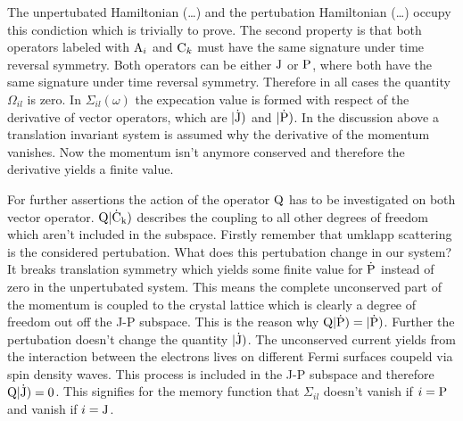The unpertubated Hamiltonian (\dots{}) and the pertubation Hamiltonian (\dots{}) occupy this condiction which is trivially to prove.
The second property is that both operators labeled with $\mathrm{A}_{i}$ and $\mathrm{C}_{k}$ must have the same signature under time reversal symmetry.
Both operators can be either $\mathrm{J}$ or $\mathrm{P}$, where both have the same signature under time reversal symmetry.
Therefore in all cases the quantity $\Omega_{il}$ is zero.
In $\Sigma_{il}(\omega)$ the expecation value is formed with respect of the derivative of vector operators, which are $|\mathrm{\dot{\mathrm{J}}})$ and $|\mathrm{\dot{\mathrm{P}}})$.
In the discussion above a translation invariant system is assumed why the derivative of the momentum vanishes.
Now the momentum isn't anymore conserved and therefore the derivative yields a finite value.

For further assertions the action of the operator $\mathrm{Q}$ has to be investigated on both vector operator.
$\mathrm{Q} |\mathrm{\dot{\mathrm{C}}_{k}})$ describes the coupling to all other degrees of freedom which aren't included in the subspace.
Firstly remember that umklapp scattering is the considered pertubation.
What does this pertubation change in our system?
It breaks translation symmetry which yields some finite value for $\dot{\mathrm{P}}$ instead of zero in the unpertubated system.
This means the complete unconserved part of the momentum is coupled to the crystal lattice which is clearly a degree of freedom out off the J-P subspace.
This is the reason why $\mathrm{Q} |\mathrm{\dot{\mathrm{P}}}) = |\mathrm{\dot{\mathrm{P}}})$.
Further the pertubation doesn't change the quantity $|\mathrm{\dot{\mathrm{J}}})$.
The unconserved current yields from the interaction between the electrons lives on different Fermi surfaces coupeld via spin density waves.
This process is included in the J-P subspace and therefore $\mathrm{Q} |\mathrm{\dot{\mathrm{J}}}) = 0$.
This signifies for the memory function that $\Sigma_{il}$ doesn't vanish if $i=\mathrm{P}$ and vanish if $i=\mathrm{J}$.

